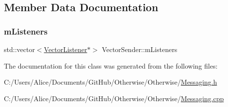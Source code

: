 \subsection{Member Data Documentation}
\mbox{\label{class_vector_sender_ad92db3530a2c293d115455fd8b6a18ad}} 
\subsubsection{\texorpdfstring{m\+Listeners}{mListeners}}
{\footnotesize\ttfamily std\+::vector$<$\hyperlink{class_vector_listener}{Vector\+Listener}$\ast$$>$ Vector\+Sender\+::m\+Listeners\hspace{0.3cm}{\ttfamily [private]}}



The documentation for this class was generated from the following files\+:\begin{DoxyCompactItemize}
\item 
C\+:/\+Users/\+Alice/\+Documents/\+Git\+Hub/\+Otherwise/\+Otherwise/\hyperlink{_messaging_8h}{Messaging.\+h}\item 
C\+:/\+Users/\+Alice/\+Documents/\+Git\+Hub/\+Otherwise/\+Otherwise/\hyperlink{_messaging_8cpp}{Messaging.\+cpp}\end{DoxyCompactItemize}
